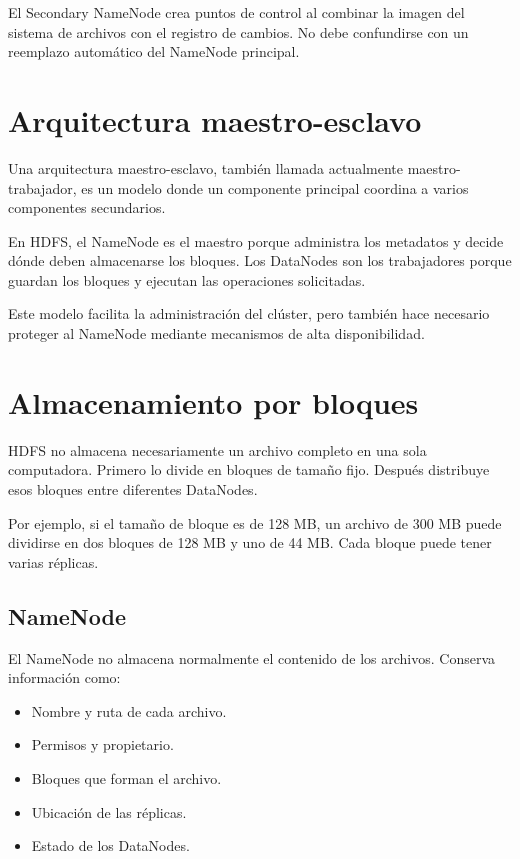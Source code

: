 El Secondary NameNode crea puntos de control al combinar la imagen del sistema
de archivos con el registro de cambios. No debe confundirse con un reemplazo
automático del NameNode principal.

\section{Arquitectura maestro-esclavo}

Una arquitectura maestro-esclavo, también llamada actualmente
maestro-trabajador, es un modelo donde un componente principal coordina a
varios componentes secundarios.

En HDFS, el NameNode es el maestro porque administra los metadatos y decide
dónde deben almacenarse los bloques. Los DataNodes son los trabajadores porque
guardan los bloques y ejecutan las operaciones solicitadas.

Este modelo facilita la administración del clúster, pero también hace necesario
proteger al NameNode mediante mecanismos de alta disponibilidad.

\section{Almacenamiento por bloques}

HDFS no almacena necesariamente un archivo completo en una sola computadora.
Primero lo divide en bloques de tamaño fijo. Después distribuye esos bloques
entre diferentes DataNodes.

Por ejemplo, si el tamaño de bloque es de 128 MB, un archivo de 300 MB puede
dividirse en dos bloques de 128 MB y uno de 44 MB. Cada bloque puede tener
varias réplicas.

\subsection{NameNode}

El NameNode no almacena normalmente el contenido de los archivos. Conserva
información como:

\begin{itemize}
    \item Nombre y ruta de cada archivo.
    \item Permisos y propietario.
    \item Bloques que forman el archivo.
    \item Ubicación de las réplicas.
    \item Estado de los DataNodes.
\end{itemize}

